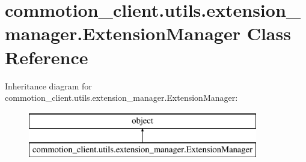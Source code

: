 \hypertarget{classcommotion__client_1_1utils_1_1extension__manager_1_1ExtensionManager}{\section{commotion\+\_\+client.\+utils.\+extension\+\_\+manager.\+Extension\+Manager Class Reference}
\label{classcommotion__client_1_1utils_1_1extension__manager_1_1ExtensionManager}
}
Inheritance diagram for commotion\+\_\+client.\+utils.\+extension\+\_\+manager.\+Extension\+Manager\+:\begin{figure}[H]
\begin{center}
\leavevmode
\includegraphics[height=2.000000cm]{classcommotion__client_1_1utils_1_1extension__manager_1_1ExtensionManager}
\end{center}
\end{figure}
